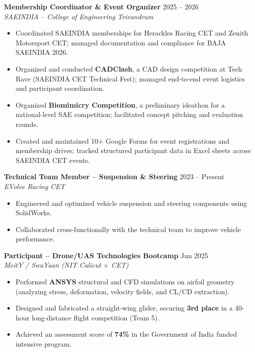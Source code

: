 \documentclass[a4paper,11pt]{article}
\begin{document}
\vspace{4pt}
\noindent
\textbf{Membership Coordinator \& Event Organizer} \hfill 2025 -- 2026\\
\textit{SAEINDIA -- College of Engineering Trivandrum}
\begin{itemize}
  \item Coordinated SAEINDIA memberships for Herackles Racing CET and Zenith Motorsport CET; managed documentation and compliance for BAJA SAEINDIA 2026.
  \item Organized and conducted \textbf{CADClash}, a CAD design competition at Tech Rave (SAEINDIA CET Technical Fest); managed end-to-end event logistics and participant coordination.
  \item Organized \textbf{Biomimicry Competition}, a preliminary ideathon for a national-level SAE competition; facilitated concept pitching and evaluation rounds.
  \item Created and maintained 10+ Google Forms for event registrations and membership drives; tracked structured participant data in Excel sheets across SAEINDIA CET events.
\end{itemize}

\vspace{4pt}
\noindent
\textbf{Technical Team Member -- Suspension \& Steering} \hfill 2023 -- Present\\
\textit{EVolve Racing CET}
\begin{itemize}
  \item Engineered and optimized vehicle suspension and steering components using SolidWorks.
  \item Collaborated cross-functionally with the technical team to improve vehicle performance.
\end{itemize}

\vspace{4pt}
\noindent
\textbf{Participant -- Drone/UAS Technologies Bootcamp} \hfill Jun 2025\\
\textit{MeitY / SwaYaan (NIT Calicut \(\times\) CET)}
\begin{itemize}
  \item Performed \textbf{ANSYS} structural and CFD simulations on airfoil geometry (analyzing stress, deformation, velocity fields, and CL/CD extraction).
  \item Designed and fabricated a straight-wing glider, securing \textbf{3rd place} in a 40-hour long-distance flight competition (Team 5).
  \item Achieved an assessment score of \textbf{74\%} in the Government of India funded intensive program.
\end{itemize}
\end{document}
